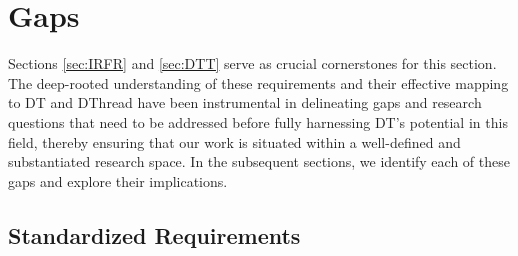 \documentclass[runningheads]{llncs}
\begin{document}
\section{Gaps}
\label{sec:GCO}
Sections \ref{sec:IRFR} and \ref{sec:DTT} serve as crucial cornerstones for this section. The deep-rooted understanding of these requirements and their effective mapping to DT and DThread have been instrumental in delineating gaps and research questions that need to be addressed before fully harnessing DT's potential in this field, thereby ensuring that our work is situated within a well-defined and substantiated research space. In the subsequent sections, we identify each of these gaps and explore their implications.


\subsection{Standardized Requirements}
\end{document}
